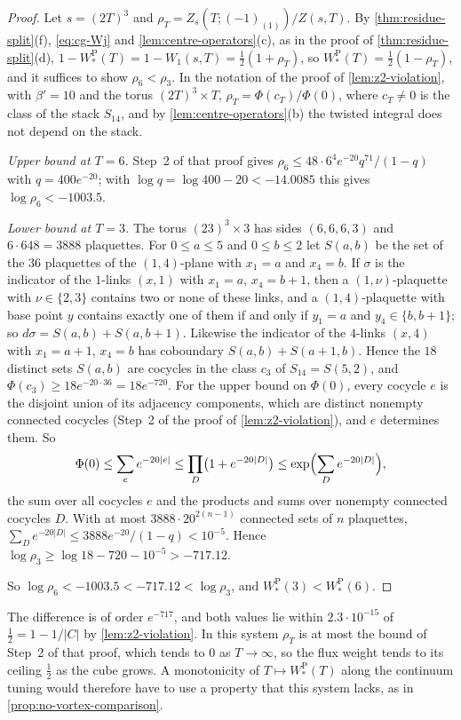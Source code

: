 \documentclass[11pt,a4paper]{amsart}
\theoremstyle{definition}
\theoremstyle{remark}
\numberwithin{equation}{section}
\newcommand{\abs}[1]{\lvert #1\rvert}      %
\newcommand{\Zpart}[2]{Z(#1,#2)}           %
\newcommand{\cube}[1]{(2#1)^3}             %
\begin{document}
\begin{proof}
Let $s=\cube T$ and $\rho_T=Z_s(T;(-1)_{(1)})/\Zpart{s}{T}$. By \cref{thm:residue-split}\textup{(f)}, \eqref{eq:cg-Wj} and \cref{lem:centre-operators}\textup{(c)}, as in the proof of \cref{thm:residue-split}\textup{(d)}, $1-W^{\mathrm P}_*(T)=1-W_1(s,T)=\frac12(1+\rho_T)$, so $W^{\mathrm P}_*(T)=\frac12(1-\rho_T)$, and it suffices to show $\rho_6<\rho_3$. In the notation of the proof of \cref{lem:z2-violation}, with $\beta'=10$ and the torus $\cube T\times T$, $\rho_T=\Phi(c_T)/\Phi(0)$, where $c_T\ne0$ is the class of the stack $S_{14}$, and by \cref{lem:centre-operators}\textup{(b)} the twisted integral does not depend on the stack.

\emph{Upper bound at $T=6$.} Step~2 of that proof gives $\rho_6\le48\cdot6^4e^{-20}q^{71}/(1-q)$ with $q=400e^{-20}$; with $\log q=\log400-20<-14.0085$ this gives $\log\rho_6<-1003.5$.

\emph{Lower bound at $T=3$.} The torus $\cube3\times3$ has sides $(6,6,6,3)$ and $6\cdot648=3888$ plaquettes. For $0\le a\le5$ and $0\le b\le2$ let $S(a,b)$ be the set of the $36$ plaquettes of the $(1,4)$-plane with $x_1=a$ and $x_4=b$. If $\sigma$ is the indicator of the $1$-links $(x,1)$ with $x_1=a$, $x_4=b+1$, then a $(1,\nu)$-plaquette with $\nu\in\{2,3\}$ contains two or none of these links, and a $(1,4)$-plaquette with base point $y$ contains exactly one of them if and only if $y_1=a$ and $y_4\in\{b,b+1\}$; so $d\sigma=S(a,b)+S(a,b+1)$. Likewise the indicator of the $4$-links $(x,4)$ with $x_1=a+1$, $x_4=b$ has coboundary $S(a,b)+S(a+1,b)$. Hence the $18$ distinct sets $S(a,b)$ are cocycles in the class $c_3$ of $S_{14}=S(5,2)$, and $\Phi(c_3)\ge18e^{-20\cdot36}=18e^{-720}$. For the upper bound on $\Phi(0)$, every cocycle $e$ is the disjoint union of its adjacency components, which are distinct nonempty connected cocycles (Step~2 of the proof of \cref{lem:z2-violation}), and $e$ determines them. So
\[
\Phi(0)\le\sum_ee^{-20\abs e}\le\prod_{D}\bigl(1+e^{-20\abs{D}}\bigr)\le\exp\Bigl(\sum_{D}e^{-20\abs{D}}\Bigr),
\]
the sum over all cocycles $e$ and the products and sums over nonempty connected cocycles $D$. With at most $3888\cdot20^{2(n-1)}$ connected sets of $n$ plaquettes, $\sum_{D}e^{-20\abs{D}}\le3888e^{-20}/(1-q)<10^{-5}$. Hence $\log\rho_3\ge\log18-720-10^{-5}>-717.12$.

So $\log\rho_6<-1003.5<-717.12<\log\rho_3$, and $W^{\mathrm P}_*(3)<W^{\mathrm P}_*(6)$.
\end{proof}

The difference is of order $e^{-717}$, and both values lie within $2.3\cdot10^{-15}$ of $\frac12=1-1/\abs{C}$ by \cref{lem:z2-violation}. In this system $\rho_T$ is at most the bound of Step~2 of that proof, which tends to $0$ as $T\to\infty$, so the flux weight tends to its ceiling $\frac12$ as the cube grows. A monotonicity of $T\mapsto W^{\mathrm P}_*(T)$ along the continuum tuning would therefore have to use a property that this system lacks, as in \cref{prop:no-vortex-comparison}.
\end{document}
